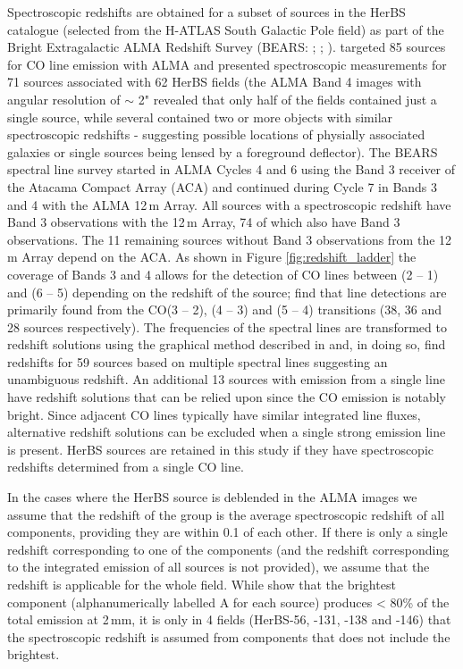 Spectroscopic redshifts are obtained for a subset of sources in the HerBS catalogue (selected from the H-ATLAS South Galactic Pole field) as part of the Bright Extragalactic ALMA Redshift Survey (BEARS: \citealt{Urquhart_2022}; \citealt{Bendo_2023}; \citealt{Hagimoto_2023}). \citealt{Urquhart_2022} targeted 85 sources for CO line emission with ALMA and presented spectroscopic measurements for 71 sources associated with 62 HerBS fields (the ALMA Band 4 images with angular resolution of $\sim$ 2" revealed that only half of the fields contained just a single source, while several contained two or more objects with similar spectroscopic redshifts - suggesting possible locations of physially associated galaxies or single sources being lensed by a foreground deflector). The BEARS spectral line survey started in ALMA Cycles 4 and 6 using the Band 3 receiver of the Atacama Compact Array (ACA) and continued during Cycle 7 in Bands 3 and 4 with the ALMA 12\,m Array. All sources with a spectroscopic redshift have Band 3 observations with the 12\,m Array, 74 of which also have Band 3 observations. The 11 remaining sources without Band 3 observations from the 12\,m Array depend on the ACA. As shown in Figure \ref{fig:redshift_ladder}  the coverage of Bands 3 and 4 allows for the detection of CO lines between (2 -- 1) and (6 -- 5) depending on the redshift of the source; \citealt{Urquhart_2022} find that line detections are primarily found from the CO(3 -- 2), (4 -- 3) and (5 -- 4) transitions (38, 36 and 28 sources respectively). The frequencies of the spectral lines are transformed to redshift solutions using the graphical method described in \citealt{Bakx_2022} and, in doing so, find redshifts for 59 sources based on multiple spectral lines suggesting an unambiguous redshift. An additional 13 sources with emission from a single line have redshift solutions that can be relied upon since the CO emission is notably bright. Since adjacent CO lines typically have similar integrated line fluxes, alternative redshift solutions can be excluded when a single strong emission line is present. HerBS sources are retained in this study if they have spectroscopic redshifts determined from a single CO line.

In the cases where the HerBS source is deblended in the ALMA images we assume that the redshift of the group is the average spectroscopic redshift of all components, providing they are within 0.1 of each other. If there is only a single redshift corresponding to one of the components (and the redshift corresponding to the integrated emission of all sources is not provided), we assume that the redshift is applicable for the whole field. While \citealt{Bendo_2023} show that the brightest component (alphanumerically labelled A for each source) produces < 80\% of the total emission at 2\,mm, it is only in 4 fields (HerBS-56, -131, -138 and -146) that the spectroscopic redshift is assumed from components that does not include the brightest.

